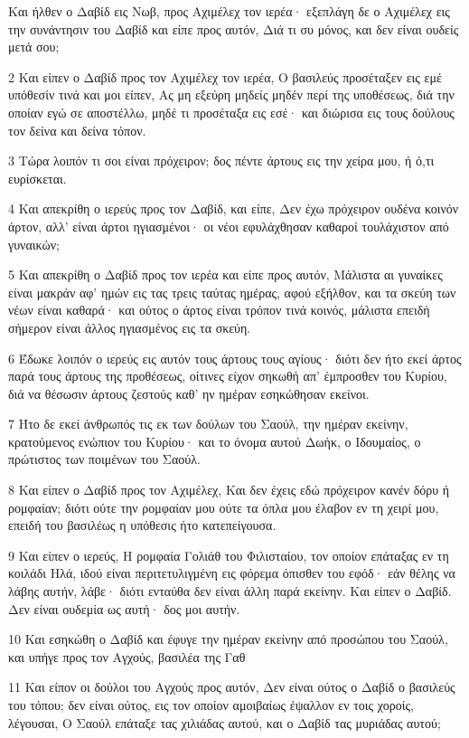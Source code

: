 \par Και ήλθεν ο Δαβίδ εις Νωβ, προς Αχιμέλεχ τον ιερέα· εξεπλάγη δε ο Αχιμέλεχ εις την συνάντησιν του Δαβίδ και είπε προς αυτόν, Διά τι συ μόνος, και δεν είναι ουδείς μετά σου;
\par 2 Και είπεν ο Δαβίδ προς τον Αχιμέλεχ τον ιερέα, Ο βασιλεύς προσέταξεν εις εμέ υπόθεσίν τινά και μοι είπεν, Ας μη εξεύρη μηδείς μηδέν περί της υποθέσεως, διά την οποίαν εγώ σε αποστέλλω, μηδέ τι προσέταξα εις εσέ· και διώρισα εις τους δούλους τον δείνα και δείνα τόπον.
\par 3 Τώρα λοιπόν τι σοι είναι πρόχειρον; δος πέντε άρτους εις την χείρα μου, ή ό,τι ευρίσκεται.
\par 4 Και απεκρίθη ο ιερεύς προς τον Δαβίδ, και είπε, Δεν έχω πρόχειρον ουδένα κοινόν άρτον, αλλ' είναι άρτοι ηγιασμένοι· οι νέοι εφυλάχθησαν καθαροί τουλάχιστον από γυναικών;
\par 5 Και απεκρίθη ο Δαβίδ προς τον ιερέα και είπε προς αυτόν, Μάλιστα αι γυναίκες είναι μακράν αφ' ημών εις τας τρεις ταύτας ημέρας, αφού εξήλθον, και τα σκεύη των νέων είναι καθαρά· και ούτος ο άρτος είναι τρόπον τινά κοινός, μάλιστα επειδή σήμερον είναι άλλος ηγιασμένος εις τα σκεύη.
\par 6 Έδωκε λοιπόν ο ιερεύς εις αυτόν τους άρτους τους αγίους· διότι δεν ήτο εκεί άρτος παρά τους άρτους της προθέσεως, οίτινες είχον σηκωθή απ' έμπροσθεν του Κυρίου, διά να θέσωσιν άρτους ζεστούς καθ' ην ημέραν εσηκώθησαν εκείνοι.
\par 7 Ήτο δε εκεί άνθρωπός τις εκ των δούλων του Σαούλ, την ημέραν εκείνην, κρατούμενος ενώπιον του Κυρίου· και το όνομα αυτού Δωήκ, ο Ιδουμαίος, ο πρώτιστος των ποιμένων του Σαούλ.
\par 8 Και είπεν ο Δαβίδ προς τον Αχιμέλεχ, Και δεν έχεις εδώ πρόχειρον κανέν δόρυ ή ρομφαίαν; διότι ούτε την ρομφαίαν μου ούτε τα όπλα μου έλαβον εν τη χειρί μου, επειδή του βασιλέως η υπόθεσις ήτο κατεπείγουσα.
\par 9 Και είπεν ο ιερεύς, Η ρομφαία Γολιάθ του Φιλισταίου, τον οποίον επάταξας εν τη κοιλάδι Ηλά, ιδού είναι περιτετυλιγμένη εις φόρεμα όπισθεν του εφόδ· εάν θέλης να λάβης αυτήν, λάβε· διότι ενταύθα δεν είναι άλλη παρά εκείνην. Και είπεν ο Δαβίδ. Δεν είναι ουδεμία ως αυτή· δος μοι αυτήν.
\par 10 Και εσηκώθη ο Δαβίδ και έφυγε την ημέραν εκείνην από προσώπου του Σαούλ, και υπήγε προς τον Αγχούς, βασιλέα της Γαθ
\par 11 Και είπον οι δούλοι του Αγχούς προς αυτόν, Δεν είναι ούτος ο Δαβίδ ο βασιλεύς του τόπου; δεν είναι ούτος, εις τον οποίον αμοιβαίως έψαλλον εν τοις χοροίς, λέγουσαι, Ο Σαούλ επάταξε τας χιλιάδας αυτού, και ο Δαβίδ τας μυριάδας αυτού;

